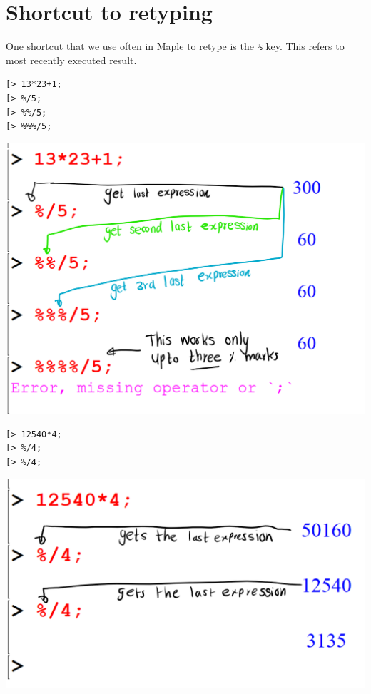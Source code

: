 \documentclass[
]{book}
\theoremstyle{definition}
\theoremstyle{definition}
\theoremstyle{definition}
\theoremstyle{definition}
\theoremstyle{remark}
\begin{document}
\section{Shortcut to retyping}\label{shortcut-to-retyping-1}

One shortcut that we use often in Maple to retype is the \texttt{\%} key. This refers to most recently executed result.

\begin{verbatim}
[> 13*23+1;
[> %/5;
[> %%/5;
[> %%%/5;
\end{verbatim}

\includegraphics{figures/Lesson 1/fig17.png}

\begin{verbatim}
[> 12540*4;
[> %/4;
[> %/4;
\end{verbatim}

\includegraphics{figures/Lesson 1/fig18.png}
\end{document}
